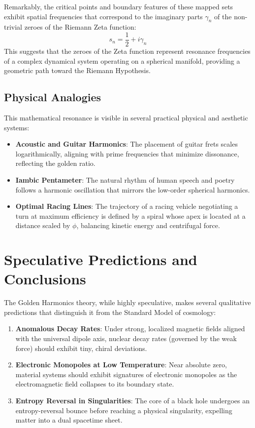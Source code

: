 \documentclass[11pt,twoside,a4paper]{article}
\begin{document}
Remarkably, the critical points and boundary features of these mapped sets exhibit spatial frequencies that correspond to the imaginary parts $\gamma_n$ of the non-trivial zeroes of the Riemann Zeta function:
\begin{equation}
s_n = \frac{1}{2} + i\gamma_n
\end{equation}
This suggests that the zeroes of the Zeta function represent resonance frequencies of a complex dynamical system operating on a spherical manifold, providing a geometric path toward the Riemann Hypothesis.

\subsection{Physical Analogies}
This mathematical resonance is visible in several practical physical and aesthetic systems:
\begin{itemize}
    \item \textbf{Acoustic and Guitar Harmonics}: The placement of guitar frets scales logarithmically, aligning with prime frequencies that minimize dissonance, reflecting the golden ratio.
    \item \textbf{Iambic Pentameter}: The natural rhythm of human speech and poetry follows a harmonic oscillation that mirrors the low-order spherical harmonics.
    \item \textbf{Optimal Racing Lines}: The trajectory of a racing vehicle negotiating a turn at maximum efficiency is defined by a spiral whose apex is located at a distance scaled by $\phi$, balancing kinetic energy and centrifugal force.
\end{itemize}

\section{Speculative Predictions and Conclusions}
The Golden Harmonics theory, while highly speculative, makes several qualitative predictions that distinguish it from the Standard Model of cosmology:
\begin{enumerate}
    \item \textbf{Anomalous Decay Rates}: Under strong, localized magnetic fields aligned with the universal dipole axis, nuclear decay rates (governed by the weak force) should exhibit tiny, chiral deviations.
    \item \textbf{Electronic Monopoles at Low Temperature}: Near absolute zero, material systems should exhibit signatures of electronic monopoles as the electromagnetic field collapses to its boundary state.
    \item \textbf{Entropy Reversal in Singularities}: The core of a black hole undergoes an entropy-reversal bounce before reaching a physical singularity, expelling matter into a dual spacetime sheet.
\end{enumerate}
\end{document}
